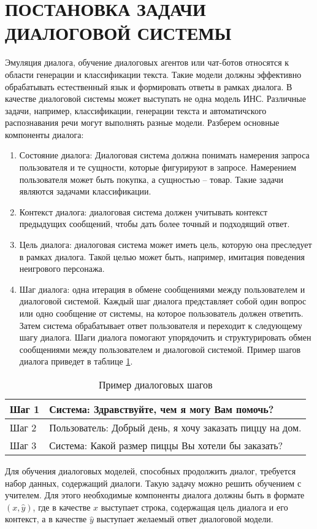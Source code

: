 \section{ПОСТАНОВКА ЗАДАЧИ ДИАЛОГОВОЙ СИСТЕМЫ}
Эмуляция диалога, обучение диалоговых агентов или чат-ботов относятся к области генерации и классификации текста. Такие модели должны эффективно обрабатывать естественный язык и формировать ответы в рамках диалога. В качестве диалоговой системы может выступать не одна модель ИНС. Различные задачи, например, классификации, генерации текста и автоматичского распознавания речи могут выполнять разные модели. Разберем основные компоненты диалога:

\begin{enumerate}
    \item Состояние диалога: Диалоговая система должна понимать намерения запроса пользователя и те сущности, которые фигурируют в запросе. Намерением пользователя может быть покупка, а сущностью -- товар. Такие задачи являются задачами классификации.
    \item Контекст диалога: диалоговая система должен учитывать контекст предыдущих сообщений, чтобы дать более точный и подходящий ответ.
    \item Цель диалога: диалоговая система может иметь цель, которую она преследует в рамках диалога. Такой целью может быть, например, имитация поведения неигрового персонажа.
    \item Шаг диалога: одна итерация в обмене сообщениями между пользователем и диалоговой системой. Каждый шаг диалога представляет собой один вопрос или одно сообщение от системы, на которое пользователь должен ответить. Затем система обрабатывает ответ пользователя и переходит к следующему шагу диалога. Шаги диалога помогают упорядочить и структурировать обмен сообщениями между пользователем и диалоговой системой. Пример шагов диалога приведет в таблице \ref{tab:dialogue-turn}.
\end{enumerate}

\begin{table}[H]
    \captionsetup{format=hang, singlelinecheck=false}
    \raggedleft
    \caption{Пример диалоговых шагов}
    \label{tab:dialogue-turn}
    \centering
    \begin{tabular}{|p{5cm}|p{10cm}|}
        \hline
        Шаг 1 & Система: Здравствуйте, чем я могу Вам помочь?            \\
        \hline
        Шаг 2 & Пользователь: Добрый день, я хочу заказать пиццу на дом. \\
        \hline
        Шаг 3 & Система: Какой размер пиццы Вы хотели бы заказать?       \\
        \hline
    \end{tabular}
\end{table}

Для обучения диалоговых моделей, способных продолжить диалог, требуется набор данных, содержащий диалоги. Такую задачу можно решить обучением с учителем. Для этого необходимые компоненты диалога должны быть в формате $(x, \hat y)$, где в качестве $x$ выступает строка, содержащая цель диалога и его контекст, а в качестве $\hat y$ выступает желаемый ответ диалоговой модели.